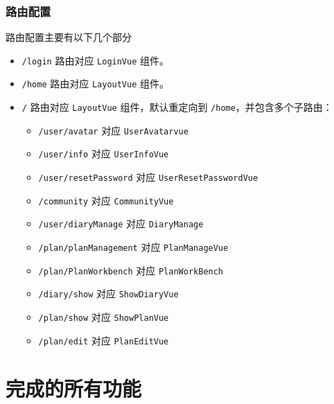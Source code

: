 \documentclass{report}
\begin{document}
\subsection{路由配置}
路由配置主要有以下几个部分
\begin{itemize}
    \item \verb|/login| 路由对应 \verb|LoginVue| 组件。
    \item \verb|/home| 路由对应 \verb|LayoutVue| 组件。
    \item \verb|/| 路由对应 \verb|LayoutVue| 组件，默认重定向到 \verb|/home|，并包含多个子路由：
    \begin{itemize}
      \item \verb|/user/avatar| 对应 \verb|UserAvatarvue|
      \item \verb|/user/info| 对应 \verb|UserInfoVue|
      \item \verb|/user/resetPassword| 对应 \verb|UserResetPasswordVue|
      \item \verb|/community| 对应 \verb|CommunityVue|
      \item \verb|/user/diaryManage| 对应 \verb|DiaryManage|
      \item \verb|/plan/planManagement| 对应 \verb|PlanManageVue|
      \item \verb|/plan/PlanWorkbench| 对应 \verb|PlanWorkBench|
      \item \verb|/diary/show| 对应 \verb|ShowDiaryVue|
      \item \verb|/plan/show| 对应 \verb|ShowPlanVue|
      \item \verb|/plan/edit| 对应 \verb|PlanEditVue|
    \end{itemize}
\end{itemize}


\chapter{完成的所有功能}
\end{document}
